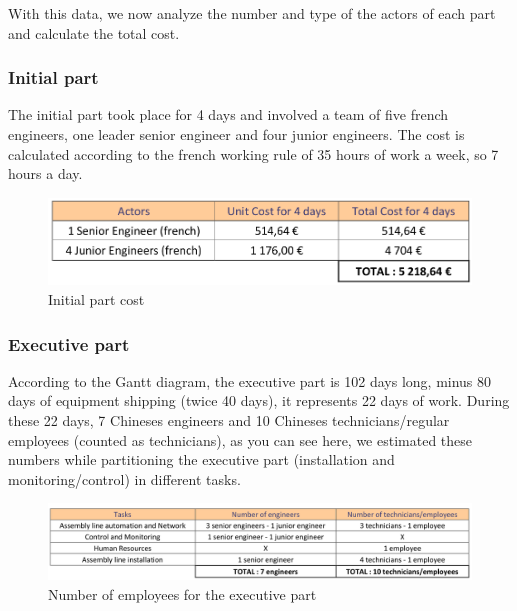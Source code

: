 With this data, we now analyze the number and type of the actors of each part and calculate the total cost.

\subsubsection{Initial part}
	The initial part took place for 4 days and involved a team of five french engineers, one leader senior engineer and four junior engineers.
	The cost is calculated according to the french working rule of 35 hours of work a week, so 7 hours a day.

	\begin{figure}[h]

	\centering
	\includegraphics[scale=0.6]{Img/firstPartHumanCost.png}
	\caption{Initial part cost}

	\end{figure}

\subsubsection{Executive part}
	According to the Gantt diagram, the executive part is 102 days long, minus 80 days of equipment shipping (twice 40 days), it represents 22 days of work.
	During these 22 days, 7 Chineses engineers and 10 Chineses technicians/regular employees (counted as technicians), as you can see here, we estimated these numbers while partitioning the executive part (installation and monitoring/control) in different tasks.\\

	\begin{figure}[h]

	\centering
	\includegraphics[scale=0.6]{Img/secondPartNbrHuman.png}
	\caption{Number of employees for the executive part}

	\end{figure}

